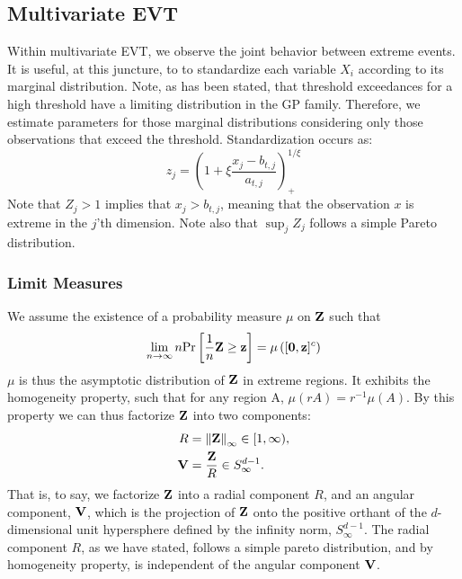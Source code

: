\subsection{Multivariate EVT}
Within multivariate EVT, we observe the joint behavior between extreme events.
  It is useful, at this juncture, to to standardize each variable $X_i$
  according to its marginal distribution.  Note, as has been stated, that
  threshold exceedances for a high threshold have a limiting distribution in the
  GP family.  Therefore, we estimate parameters for those marginal distributions
  considering only those observations that exceed the threshold.
  Standardization occurs as:
\begin{equation}
    z_j = \left(1 + \xi\frac{x_j - b_{t,j}}{a_{t,j}}\right)_{+}^{1/\xi}
\end{equation}
Note that $Z_j > 1$ implies that $x_j > b_{t,j}$, meaning that the observation
  $x$ is extreme in the $j$'th dimension.  Note also that $\sup_j Z_j$ follows a
  simple Pareto distribution.

\subsubsection{Limit Measures}
We assume the existence of a probability measure $\mu$ on ${\bf Z}$ such that
\begin{equation}
\lim_{n\rightarrow\infty}n\text{Pr}\left[\frac{1}{n}{\bf Z} \geq {\bf z}\right] = \mu\left([{\bf 0}, {\bf z}]^c\right)
\end{equation}
$\mu$ is thus the asymptotic distribution of ${\bf Z}$ in extreme regions.  It
  exhibits the homogeneity property, such that for any region A,
  $\mu(rA) = r^{-1}\mu(A)$.  By this property we can thus factorize ${\bf Z}$
  into two components:
\begin{equation}
  \begin{aligned}
    R &= \left\lVert {\bf Z} \right\rVert_{\infty} \in [1, \infty),\\
    {\bf V} &= \frac{{\bf Z}}{R} \in S_{\infty}^{d-1}.
  \end{aligned}
\end{equation}
That is, to say, we factorize ${\bf Z}$ into a radial component $R$, and an
  angular component, ${\bf V}$, which is the projection of ${\bf Z}$ onto the
  positive orthant of the $d$-dimensional unit hypersphere defined by the
  infinity norm, $S_{\infty}^{d-1}$. The radial component $R$, as we have
  stated, follows a simple pareto distribution, and by homogeneity property, is
  independent of the angular component ${\bf V}$.

